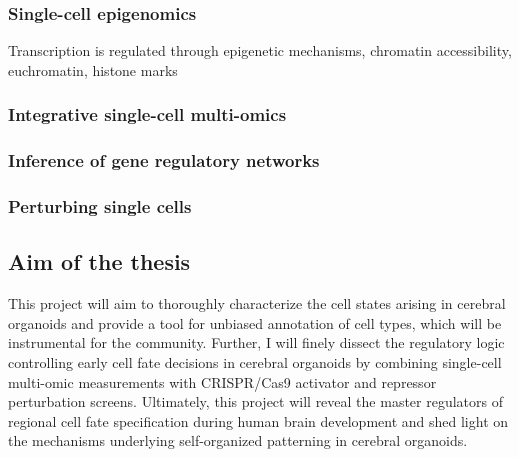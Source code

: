 \subsubsection{Single-cell epigenomics}

Transcription is regulated through epigenetic mechanisms, chromatin accessibility, euchromatin, histone marks



\subsubsection{Integrative single-cell multi-omics}


\subsubsection{Inference of gene regulatory networks}


\subsubsection{Perturbing single cells}




\subsection{Aim of the thesis}
This project will aim to thoroughly characterize the cell states arising in cerebral organoids and provide a tool for unbiased annotation of cell types, which will be instrumental for the community. Further, I will finely dissect the regulatory logic controlling early cell fate decisions in cerebral organoids by combining single-cell multi-omic measurements with CRISPR/Cas9 activator and repressor perturbation screens. Ultimately, this project will reveal the master regulators of regional cell fate specification during human brain development and shed light on the mechanisms underlying self-organized patterning in cerebral organoids.


\beginbibliography
